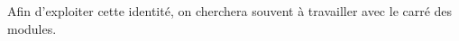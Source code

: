 \documentclass{magnolia}
\begin{document}
\begin{remarqueUnique}
\remarque Afin d'exploiter cette identité, on cherchera souvent à travailler avec le carré des modules.
\end{remarqueUnique}

\end{document}
